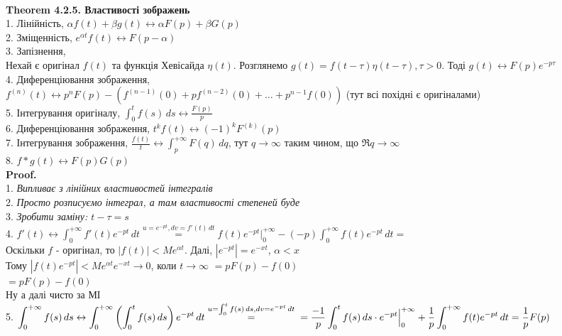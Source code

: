 \documentclass{math_library}
\begin{document}
\bigskip \\
\textbf{Theorem 4.2.5. Властивості зображень}\\
1. Лінійність, $\alpha f(t) + \beta g(t) \leftrightarrow \alpha F(p) + \beta G(p)$
\bigskip \\
2. Зміщенність, $e^{\alpha t}f(t) \leftrightarrow F(p-\alpha)$
\bigskip \\
3. Запізнення,\\
Нехай є оригінал $f(t)$ та функція Хевісайда $\eta(t)$. Розглянемо $g(t) = f(t-\tau) \eta(t-\tau), \tau>0$. Тоді $g(t) \leftrightarrow F(p)e^{-p\tau}$
\bigskip \\
4. Диференціювання зображення,\\ $f^{(n)}(t) \leftrightarrow p^n F(p) - (f^{(n-1)}(0)+ pf^{(n-2)}(0)+\dots + p^{n-1}f(0))$ (тут всі похідні є оригіналами)
\bigskip \\
5. Інтегрування оригіналу, $\displaystyle \int_0^t f(s)\,ds \leftrightarrow \frac{F(p)}{p}$
\bigskip \\
6. Диференціювання зображення, $t^k f(t) \leftrightarrow (-1)^k F^{(k)}(p)$
\bigskip \\
7. Інтегрування зображення, $\displaystyle \frac{f(t)}{t} \leftrightarrow \int_p^{+\infty} F(q)\,dq$, тут $q \to \infty$ таким чином, що $\Re q \to \infty$
\bigskip \\
8. $f*g(t) \leftrightarrow F(p) G(p)$\\
\textbf{Proof.}\\
1. \textit{Випливає з лінійних властивостей інтегралів}
\bigskip \\
2. \textit{Просто розписуємо інтеграл, а там властивості степеней буде}
\bigskip \\
3. \textit{Зробити заміну: $t - \tau = s$}
\bigskip \\
4. $f'(t) \leftrightarrow \displaystyle \int_0^{+\infty} f'(t)e^{-pt}\,dt \overset{u=e^{-pt}, dv=f'(t)\,dt}{=} f(t)e^{-pt}\Big|_0^{+\infty} - (-p) \int_0^{+\infty} f(t)e^{-pt}\,dt = $\\
Оскільки $f$ -  оригінал, то $|f(t)| < Me^{\alpha t}$. Далі, $|e^{-pt}| = e^{-xt}$, $\alpha < x$\\
Тому $|f(t)e^{-pt}| < Me^{\alpha t}e^{-xt} \to 0$, коли $t \to \infty$
$= pF(p) - f(0)$\\
$=pF(p)-f(0)$\\
Ну а далі чисто за МІ
\bigskip \\
5. $\displaystyle \int_0^{+\infty} f(s)\,ds \leftrightarrow \int_0^{+\infty} \left( \int_0^t f(s)\,ds \right) e^{-pt}\,dt \overset{\scriptstyle u = \int_0^t f(s)\,ds, dv = e^{-pt}\,dt}{=} \\ = \frac{-1}{p} \int_0^t f(s)\,ds \cdot e^{-pt} \Big|_0^{+\infty} + \frac{1}{p} \int_0^{+\infty} f(t)e^{-pt}\,dt = \frac{1}{p}F(p)$
\end{document}
